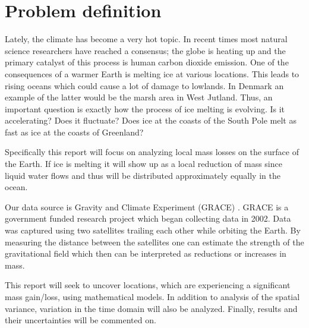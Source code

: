 \section{Problem definition}
Lately, the climate has become a very hot topic. 
In recent times most natural science researchers have reached a consensus;
the globe is heating up and the primary catalyst of this process is human carbon dioxide emission.
One of the consequences of a warmer Earth is melting ice at various locations.
This leads to rising oceans which could cause a lot of damage to lowlands.
In Denmark an example of the latter would be the marsh area in West Jutland.
Thus, an important question is exactly how the process of ice melting is evolving. 
Is it accelerating? Does it fluctuate? Does ice at the coasts of the South Pole melt as fast as ice at the coasts of Greenland?

Specifically this report will focus on analyzing local mass losses on the surface of the Earth.
If ice is melting it will show up as a local reduction of mass since liquid water flows and thus will be distributed approximately equally in the ocean. 

Our data source is Gravity and Climate Experiment (GRACE) \cite{GRACE-data-source}. 
GRACE is a government funded research project which began collecting data in 2002.
Data was captured using two satellites trailing each other while orbiting the Earth.
By measuring the distance between the satellites one can estimate the strength of the gravitational field which then can be interpreted as reductions or increases in mass.

This report will seek to uncover locations, which are experiencing a significant mass gain/loss, using mathematical models. 
In addition to analysis of the spatial variance, variation in the time domain will also be analyzed.
Finally, results and their uncertainties will be commented on. 
